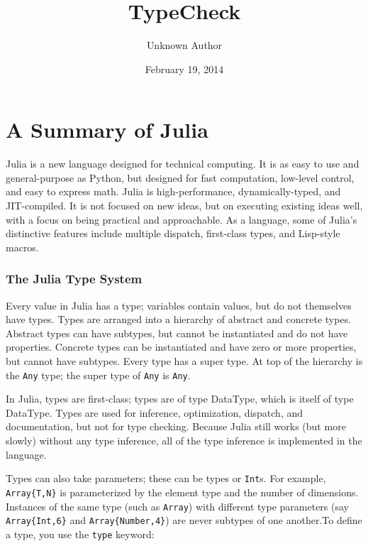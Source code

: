 \documentclass[letterpaper,10pt,english]{/usr/share/sphinx/texinputs/sphinxhowto}
\title{TypeCheck}
\date{February 19, 2014}
\author{Unknown Author}
\begin{document}
        
            \maketitle
        

        


        
        \part{A Summary of Julia}Julia is a new language designed for technical computing. It is as easy
to use and general-purpose as Python, but designed for fast computation,
low-level control, and easy to express math. Julia is high-performance,
dynamically-typed, and JIT-compiled. It is not focused on new ideas, but
on executing existing ideas well, with a focus on being practical and
approachable. As a language, some of Julia's distinctive features
include multiple dispatch, first-class types, and Lisp-style macros.\section{The Julia Type System}Every value in Julia has a type; variables contain values, but do not
themselves have types. Types are arranged into a hierarchy of abstract
and concrete types. Abstract types can have subtypes, but cannot be
instantiated and do not have properties. Concrete types can be
instantiated and have zero or more properties, but cannot have subtypes.
Every type has a super type. At top of the hierarchy is the \texttt{Any}
type; the super type of \texttt{Any} is \texttt{Any}.

In Julia, types are first-class; types are of type DataType, which is
itself of type DataType. Types are used for inference, optimization,
dispatch, and documentation, but not for type checking. Because Julia
still works (but more slowly) without any type inference, all of the
type inference is implemented in the language.

Types can also take parameters; these can be types or \texttt{Int}s. For
example, \texttt{Array\{T,N\}} is parameterized by the element type and
the number of dimensions. Instances of the same type (such as
\texttt{Array}) with different type parameters (say
\texttt{Array\{Int,6\}} and \texttt{Array\{Number,4\}}) are never
subtypes of one another.To define a type, you use the \texttt{type} keyword:

\end{document}
